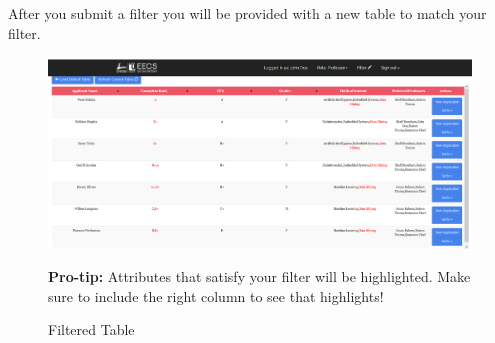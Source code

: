 \documentclass[fontsize=12pt,paper=letter,twoside]{scrartcl}
\begin{document}
\clearpage
After you submit a filter you will be provided with a new table to match your filter.
\begin{figure}[!htb]
\begin{center}
\includegraphics[width=.99\textwidth]{images/filtered_table.png}
\end{center}
\caption{Filtered Table}
\textbf{Pro-tip:} Attributes that satisfy your filter will be highlighted. Make sure to include the right column to see that highlights!
\label{fig:filtered_table}
\end{figure}

\clearpage 
\end{document}
